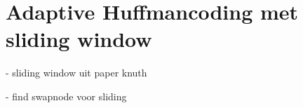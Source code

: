 \section{Adaptive Huffmancoding met sliding window}

- sliding window uit paper knuth

- find swapnode voor sliding